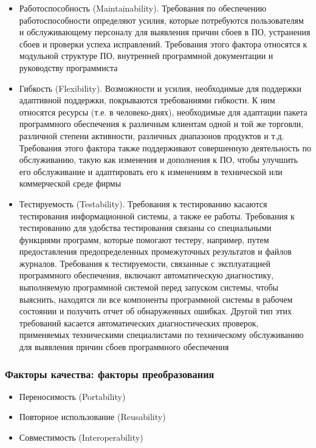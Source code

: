 \documentclass{../industrial-development}
\begin{document}
\lecturenotes

 	 \begin{itemize}
\item Работоспособность (Maintainability). Требования по обеспечению работоспособности определяют усилия, которые потребуются пользователям и обслуживающему персоналу для выявления причин сбоев в ПО, устранения сбоев и проверки успеха исправлений. Требования этого фактора относятся к модульной структуре ПО, внутренней программной документации и руководству программиста
\item Гибкость (Flexibility). Возможности и усилия, необходимые для поддержки адаптивной поддержки, покрываются требованиями гибкости. К ним относятся ресурсы (т.е. в человеко-днях), необходимые для адаптации пакета программного обеспечения к различным клиентам одной и той же торговли, различной степени активности, различных диапазонов продуктов и т.д. Требования этого фактора также поддерживают совершенную деятельность по обслуживанию, такую как изменения и дополнения к ПО, чтобы улучшить его обслуживание и адаптировать его к изменениям в технической или коммерческой среде фирмы
\item Тестируемость (Testability). Требования к тестированию касаются тестирования информационной системы, а также ее работы. Требования к тестированию для удобства тестирования связаны со специальными функциями программ, которые помогают тестеру, например, путем предоставления предопределенных промежуточных результатов и файлов журналов. Требования к тестируемости, связанные с эксплуатацией программного обеспечения, включают автоматическую диагностику, выполняемую программной системой перед запуском системы, чтобы выяснить, находятся ли все компоненты программной системы в рабочем состоянии и получить отчет об обнаруженных ошибках. Другой тип этих требований касается автоматических диагностических проверок, применяемых техническими специалистами по техническому обслуживанию для выявления причин сбоев программного обеспечения~\cite[с.~41--42]{SQA-Galin}
  	\end{itemize}



\begin{frame} \frametitle{Факторы качества: факторы преобразования}
 	 \begin{itemize}
\item Переносимость (Portability)
\item Повторное использование (Reusability)
\item Совместимость (Interoperability)
  	\end{itemize}
\end{frame}
\end{document}
